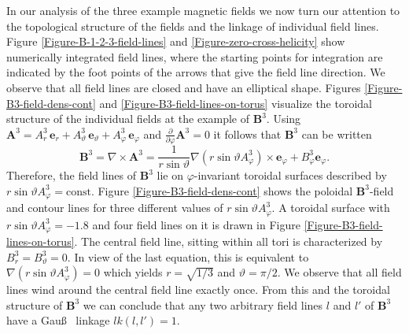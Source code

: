 \documentclass[10pt]{iopart}
\def \p{{\partial}}
\def \bA{{\mathbf{A}}}
\def \bB{{\mathbf{B}}}
\def \be{{\mathbf{e}}}
\begin{document}
In our analysis of the three example magnetic fields we now turn our
attention to the topological structure of the fields
 and the linkage of individual field lines.
Figure \ref{Figure-B-1-2-3-field-lines} and
\ref{Figure-zero-cross-helicity}
show numerically integrated field lines, where the starting
points for integration are indicated by the foot points
of the arrows that give the field line direction.
We observe that all field lines are closed and have an elliptical shape.
Figures 
\ref{Figure-B3-field-dens-cont} and 
\ref{Figure-B3-field-lines-on-torus}
visualize the toroidal structure of the
individual fields at the example of $\bB^3$.
Using $\bA^3 =   A^3_r\, \be_r + A^3_\vartheta\, \be_\vartheta + 
                 A^3_\varphi\, \be_\varphi $ 
and $\frac{\p}{\p \varphi}\bA^3=0$ it follows
that $\bB^3$ can be written
\begin{equation}
   \bB^3 = \nabla\times\bA^3 = \frac{1}{r\sin\vartheta}
         \nabla(r\sin\vartheta A^3_\varphi)\times\be_\varphi
                           + B^3_\varphi\be_\varphi. 
\end{equation}
Therefore, the field lines of $\bB^3$ lie on $\varphi$-invariant
toroidal surfaces described by
$r\sin\vartheta A^3_\varphi = \mbox{const}$.
Figure \ref{Figure-B3-field-dens-cont}
shows the poloidal $\bB^3$-field and contour lines for three different
values of $r\sin\vartheta A^3_\varphi$.
A toroidal surface with
$r\sin\vartheta A^3_\varphi = -1.8$ and four field lines on it is
drawn in Figure \ref{Figure-B3-field-lines-on-torus}.
The central field line, sitting within all tori is characterized by
$B^3_r = B^3_\vartheta = 0$. In view of the last equation, this is
equivalent to
$\nabla(r\sin\vartheta A^3_\varphi)=0$ which yields $r=\sqrt{1/3}$
and $\vartheta=\pi/2$.
We observe that all field lines wind around the central field line
exactly once. From this and the toroidal structure of $\bB^3$ we can
conclude that any two arbitrary field lines $l$ and $l'$ 
of $\bB^3$ have a Gau\ss~ linkage $lk(l,l')=1$.
\end{document}
